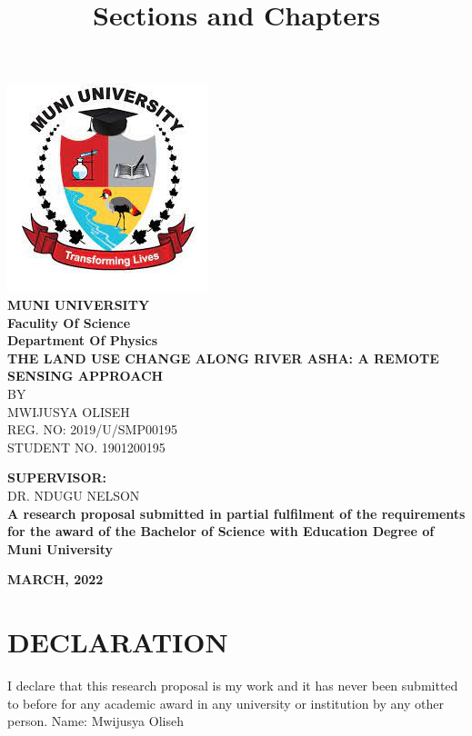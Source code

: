 \documentclass[12pt, a4paper, oneside]{thesis}
\title{Sections and Chapters}
\begin{document}
\pagestyle{plain}
\graphicspath{{./images/}} 
\frontmatter
\begin{center}
\includegraphics{mulogo}\\
\textbf{MUNI UNIVERSITY }\\
\textbf{Faculity Of Science }\\
\textbf{Department Of Physics}\\
\vspace{2cm}
{\LARGE \bf  THE LAND USE CHANGE ALONG RIVER ASHA: A REMOTE SENSING APPROACH }\\ [2.0cm]

BY \\ MWIJUSYA OLISEH \\ REG. NO: 2019/U/SMP00195 \\ STUDENT NO. 1901200195
\vspace{1cm}

\textbf{SUPERVISOR:} \\ DR. NDUGU NELSON\\

 
\textbf{A research proposal submitted in partial fulfilment of the requirements for the award of the Bachelor of Science with Education Degree of Muni University}
\hfill \break

 \textbf{MARCH, 2022}
\end{center}

\clearpage 
\vspace{7cm}

\section*{DECLARATION}

I declare that this research proposal is my work and it has never been submitted to before for any academic award in any university or institution by any other person.
\vspace{1cm}
Name:   Mwijusya Oliseh\\
\end{document}
